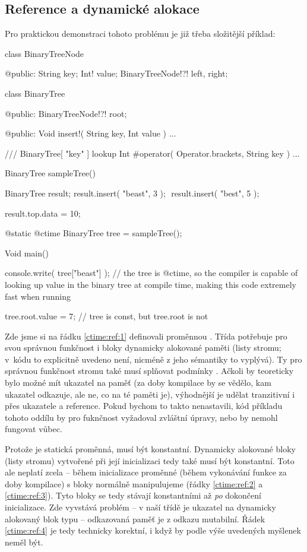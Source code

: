 \subsection{Reference a dynamické alokace} \label{ctime:ref}
Pro praktickou demonstraci tohoto problému je již třeba složitější příklad:
\begin{code}
class BinaryTreeNode {
	
@public:
	String key;
	Int! value;
	BinaryTreeNode!?! left, right;
	
}
	
class BinaryTree {

@public:
	BinaryTreeNode!?! root;
	
@public:
	Void insert!( String key, Int value ) { ... }
	
	/// BinaryTree[ "key" ] lookup
	Int #operator( Operator.brackets, String key ) { ... }

}

BinaryTree sampleTree() {
	BinaryTree result;
	result.insert( "beast", 3 ); $\label{ctime:ref:2}$
	result.insert( "best", 5 ); $\label{ctime:ref:3}$
	
	result.top.data = 10;
}

@static @ctime BinaryTree tree = sampleTree(); $\label{ctime:ref:1}$

Void main() {
	console.write( tree["beast"] ); // the tree is @ctime, so the compiler is capable of looking up value in the binary tree at compile time, making this code extremely fast when running
	
	tree.root.value = 7; // tree is const, but tree.root is not $\label{ctime:ref:4}$
}
\end{code}

Zde jsme si na řádku \ref{ctime:ref:1} definovali \ctime proměnnou .  Třída  potřebuje pro svou správnou funkčnost i bloky dynamicky alokované paměti (listy stromu; v~kódu to explicitně uvedeno není, nicméně z jeho sémantiky to vyplývá). Ty pro správnou funkčnost stromu také musí splňovat podmínky \ctime. Ačkoli by teoreticky bylo možné mít \ctime ukazatel na \nonctime paměť (za doby kompilace by se vědělo, kam ukazatel odkazuje, ale ne, co na té paměti je), výhodnější je udělat \ctime tranzitivní i přes ukazatele a reference. Pokud bychom to takto nenastavili, kód příkladu tohoto oddílu by pro fuknčnost vyžadoval zvláštní úpravy, nebo by nemohl fungovat vůbec.

Protože  je statická \ctime proměnná, musí být konstantní. Dynamicky alokované bloky (listy stromu) vytvořené při její inicializaci tedy také musí být konstantní. Toto ale neplatí zcela -- během inicializace proměnné  (během vykonávání funkce  za doby kompilace) s bloky normálně manipulujeme (řádky \ref{ctime:ref:2} a \ref{ctime:ref:3}). Tyto bloky se tedy stávají konstantními až \textit{po} dokončení inicializace. Zde vyvstává problém -- v naší třídě  je ukazatel na dynamicky alokovaný blok typu  -- odkazovaná paměť je z odkazu mutabilní. Řádek \ref{ctime:ref:4} je tedy technicky korektní, i když by podle výše uvedených myšlenek neměl být.

